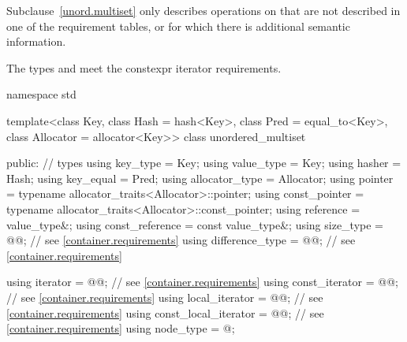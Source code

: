 \pnum
Subclause~\ref{unord.multiset} only describes operations on  that
are not described in one of the requirement tables, or for which there
is additional semantic information.

\pnum
The types  and  meet
the constexpr iterator requirements.

%
\begin{codeblock}
namespace std {
  template<class Key,
           class Hash = hash<Key>,
           class Pred = equal_to<Key>,
           class Allocator = allocator<Key>>
  class unordered_multiset {
  public:
    // types
    using key_type             = Key;
    using value_type           = Key;
    using hasher               = Hash;
    using key_equal            = Pred;
    using allocator_type       = Allocator;
    using pointer              = typename allocator_traits<Allocator>::pointer;
    using const_pointer        = typename allocator_traits<Allocator>::const_pointer;
    using reference            = value_type&;
    using const_reference      = const value_type&;
    using size_type            = @@; // see \ref{container.requirements}
    using difference_type      = @@; // see \ref{container.requirements}

    using iterator             = @@; // see \ref{container.requirements}
    using const_iterator       = @@; // see \ref{container.requirements}
    using local_iterator       = @@; // see \ref{container.requirements}
    using const_local_iterator = @@; // see \ref{container.requirements}
    using node_type            = @\unspec@;

}}
\end{codeblock}
